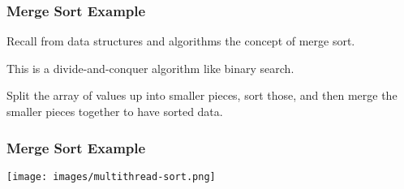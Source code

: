 \begin{frame}
	\frametitle{Merge Sort Example}

	Recall from data structures and algorithms the concept of merge sort.

	This is a divide-and-conquer algorithm like binary search.

	Split the array of values up into smaller pieces, sort those, and then merge the smaller pieces together to have sorted data.


\end{frame}


\begin{frame}
	\frametitle{Merge Sort Example}

	\begin{center}
		\texttt{[image: images/multithread-sort.png]}
	\end{center}


\end{frame}





